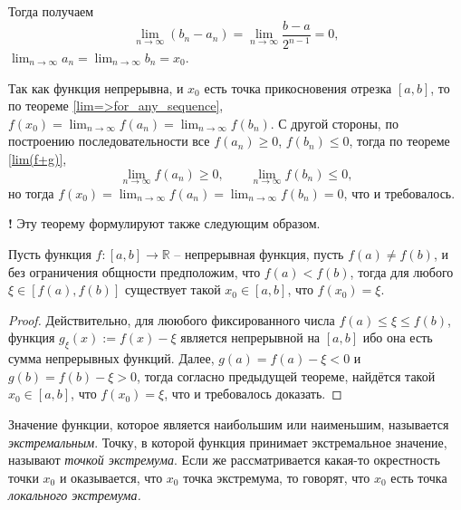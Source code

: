 Тогда получаем
\[
 \lim_{n \to \infty} (b_n - a_n) = \lim_{n \to \infty} \frac{b-a}{2^{n-1}} =0,
\]
\ie $\lim_{n \to \infty} a_n = \lim_{n \to \infty} b_n =x_0.$

Так как функция непрерывна, и $x_0$ есть точка прикосновения отрезка $[a,b]$, то по теореме  \ref{lim=>for_any_sequence}, $f(x_0) = \lim_{n \to \infty} f(a_n) = \lim_{n \to \infty} f(b_n)$. С другой стороны, по построению последовательности все $f(a_n) \ge 0$, $f(b_n)\le 0$, тогда по теореме \ref{lim(f+g)},
\[
 \lim_{n \to \infty} f(a_n)\ge 0, \qquad  \lim_{n \to \infty} f(b_n)\le 0,
\]
 но тогда $f(x_0) =  \lim_{n \to \infty} f(a_n) =  \lim_{n \to \infty} f(b_n) = 0$, что и требовалось. 


\begin{mydangerr}{\bf!}
 Эту теорему формулируют также следующим образом.
\end{mydangerr}

\begin{corollary}\label{mean_value_theorem}
    Пусть функция $f:[a,b] \to \mathbb{R}$ -- непрерывная функция, пусть $f(a) \ne f(b)$, и без ограничения общности предположим, что $f(a) < f(b)$, тогда для любого $\xi\in [f(a), f(b)]$ существует такой $x_0 \in [a,b]$, что $f(x_0) = \xi.$
\end{corollary}

\begin{proof}
    Действительно, для лююбого фиксированного числа $f(a) \le \xi \le f(b)$, функция $g_\xi(x) := f(x) - \xi$ является непрерывной на $[a,b]$ ибо она есть сумма непрерывных функций. Далее, $g(a) = f(a) - \xi <0$ и $g(b) = f(b) - \xi >0$, тогда согласно предыдущей теореме, найдётся такой $x_0 \in [a,b]$, что $f(x_0) = \xi$, что и требовалось доказать.
\end{proof}

\begin{definition}
    Значение функции, которое является наибольшим или наименьшим, называется \textit{экстремальным}. Точку, в которой функция принимает экстремальное значение, называют \textit{точкой экстремума}. Если же рассматривается какая-то окрестность точки $x_0$ и оказывается, что $x_0$ точка экстремума, то говорят, что $x_0$ есть точка \textit{локального экстремума.} 
\end{definition}


